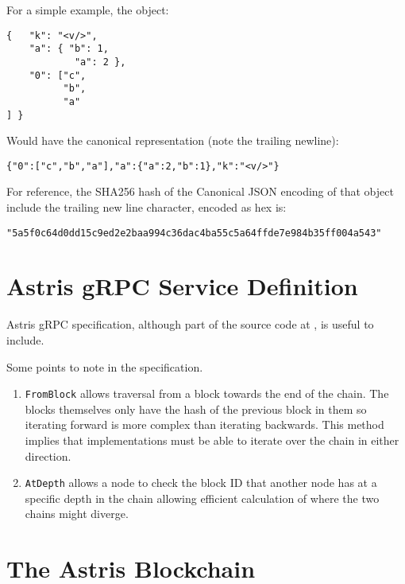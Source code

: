 For a simple example, the object:

\begin{lstlisting}[style=ES6]
{   "k": "<v/>",
    "a": { "b": 1,
            "a": 2 },
    "0": ["c",
          "b",
          "a"
] }
\end{lstlisting}

Would have the canonical representation (note the trailing newline):

\begin{lstlisting}[style=ES6]
{"0":["c","b","a"],"a":{"a":2,"b":1},"k":"<v/>"}

\end{lstlisting}

For reference, the SHA256 hash of the Canonical JSON encoding of that object include the trailing new line character, encoded as hex is:

\begin{lstlisting}[style=ES6]
"5a5f0c64d0dd15c9ed2e2baa994c36dac4ba55c5a64ffde7e984b35ff004a543"
\end{lstlisting}

\chapter{Astris gRPC Service Definition}
\label{appendix:grpc}

Astris gRPC specification, although part of the source code at {\surl{\astrisrepo}}, is useful to include.



Some points to note in the specification.

\begin{enumerate}
    \item \texttt{FromBlock} allows traversal from a block towards the end of the chain. The blocks themselves only have the hash of the previous block in them so iterating forward is more complex than iterating backwards. This method implies that implementations must be able to iterate over the chain in either direction.
    \item \texttt{AtDepth} allows a node to check the block ID that another node has at a specific depth in the chain allowing efficient calculation of where the two chains might diverge.
\end{enumerate}

\chapter{The Astris Blockchain}
\label{appendix:blockchain}

